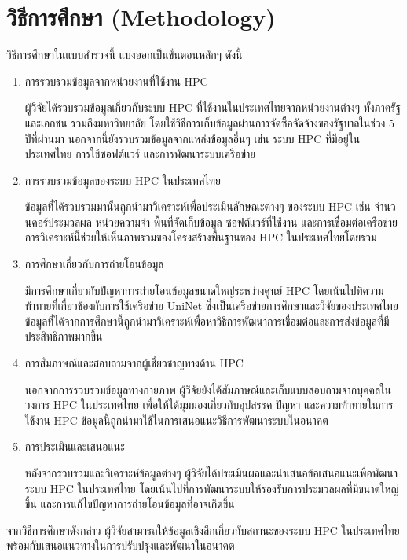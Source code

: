\documentclass[a4paper,12pt]{extarticle}
\begin{document}
\section{วิธีการศึกษา (Methodology)}
วิธีการศึกษาในแบบสำรวจนี้ แบ่งออกเป็นขั้นตอนหลักๆ ดังนี้
\begin{enumerate}
	\item การรวบรวมข้อมูลจากหน่วยงานที่ใช้งาน HPC

	ผู้วิจัยได้รวบรวมข้อมูลเกี่ยวกับระบบ HPC ที่ใช้งานในประเทศไทยจากหน่วยงานต่างๆ ทั้งภาครัฐและเอกชน รวมถึงมหาวิทยาลัย โดยใช้วิธีการเก็บข้อมูลผ่านการจัดซื้อจัดจ้างของรัฐบาลในช่วง 5 ปีที่ผ่านมา นอกจากนี้ยังรวบรวมข้อมูลจากแหล่งข้อมูลอื่นๆ เช่น ระบบ HPC ที่มีอยู่ในประเทศไทย การใช้ซอฟต์แวร์ และการพัฒนาระบบเครือข่าย
	\item การรวบรวมข้อมูลของระบบ HPC ในประเทศไทย

	ข้อมูลที่ได้รวบรวมมานั้นถูกนำมาวิเคราะห์เพื่อประเมินลักษณะต่างๆ ของระบบ HPC เช่น จำนวนคอร์ประมวลผล หน่วยความจำ พื้นที่จัดเก็บข้อมูล ซอฟต์แวร์ที่ใช้งาน และการเชื่อมต่อเครือข่าย การวิเคราะห์นี้ช่วยให้เห็นภาพรวมของโครงสร้างพื้นฐานของ HPC ในประเทศไทยโดยรวม
	\item การศึกษาเกี่ยวกับการถ่ายโอนข้อมูล

	มีการศึกษาเกี่ยวกับปัญหาการถ่ายโอนข้อมูลขนาดใหญ่ระหว่างศูนย์ HPC โดยเน้นไปที่ความท้าทายที่เกี่ยวข้องกับการใช้เครือข่าย UniNet ซึ่งเป็นเครือข่ายการศึกษาและวิจัยของประเทศไทย ข้อมูลที่ได้จากการศึกษานี้ถูกนำมาวิเคราะห์เพื่อหาวิธีการพัฒนาการเชื่อมต่อและการส่งข้อมูลที่มีประสิทธิภาพมากขึ้น
	\item การสัมภาษณ์และสอบถามจากผู้เชี่ยวชาญทางด้าน HPC

	นอกจากการรวบรวมข้อมูลทางกายภาพ ผู้วิจัยยังได้สัมภาษณ์และเก็บแบบสอบถามจากบุคคลในวงการ HPC ในประเทศไทย เพื่อให้ได้มุมมองเกี่ยวกับอุปสรรค ปัญหา และความท้าทายในการใช้งาน HPC ข้อมูลนี้ถูกนำมาใช้ในการเสนอแนะวิธีการพัฒนาระบบในอนาคต
	\item การประเมินและเสนอแนะ

	หลังจากรวบรวมและวิเคราะห์ข้อมูลต่างๆ ผู้วิจัยได้ประเมินผลและนำเสนอข้อเสนอแนะเพื่อพัฒนาระบบ HPC ในประเทศไทย โดยเน้นไปที่การพัฒนาระบบให้รองรับการประมวลผลที่มีขนาดใหญ่ขึ้น และการแก้ไขปัญหาการถ่ายโอนข้อมูลที่อาจเกิดขึ้น
\end{enumerate}
จากวิธีการศึกษาดังกล่าว ผู้วิจัยสามารถให้ข้อมูลเชิงลึกเกี่ยวกับสถานะของระบบ HPC ในประเทศไทย พร้อมกับเสนอแนวทางในการปรับปรุงและพัฒนาในอนาคต

\newpage

\end{document}
